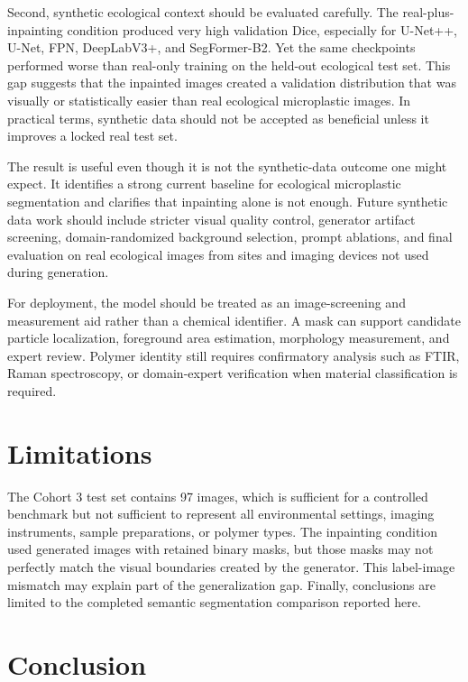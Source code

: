 \documentclass[11pt]{article}
\begin{document}
Second, synthetic ecological context should be evaluated carefully. The real-plus-inpainting condition produced very high validation Dice, especially for U-Net++, U-Net, FPN, DeepLabV3+, and SegFormer-B2. Yet the same checkpoints performed worse than real-only training on the held-out ecological test set. This gap suggests that the inpainted images created a validation distribution that was visually or statistically easier than real ecological microplastic images. In practical terms, synthetic data should not be accepted as beneficial unless it improves a locked real test set.

The result is useful even though it is not the synthetic-data outcome one might expect. It identifies a strong current baseline for ecological microplastic segmentation and clarifies that inpainting alone is not enough. Future synthetic data work should include stricter visual quality control, generator artifact screening, domain-randomized background selection, prompt ablations, and final evaluation on real ecological images from sites and imaging devices not used during generation.

For deployment, the model should be treated as an image-screening and measurement aid rather than a chemical identifier. A mask can support candidate particle localization, foreground area estimation, morphology measurement, and expert review. Polymer identity still requires confirmatory analysis such as FTIR, Raman spectroscopy, or domain-expert verification when material classification is required.

\section{Limitations}

The Cohort 3 test set contains 97 images, which is sufficient for a controlled benchmark but not sufficient to represent all environmental settings, imaging instruments, sample preparations, or polymer types. The inpainting condition used generated images with retained binary masks, but those masks may not perfectly match the visual boundaries created by the generator. This label-image mismatch may explain part of the generalization gap. Finally, conclusions are limited to the completed semantic segmentation comparison reported here.

\section{Conclusion}
\end{document}

